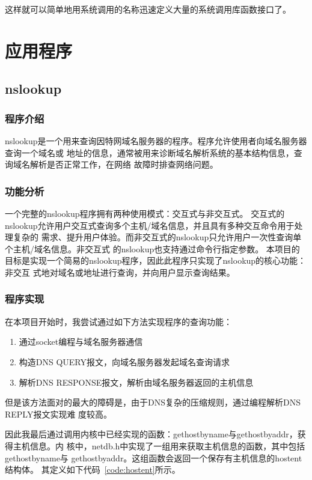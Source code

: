 \documentclass[a4paper,twoside]{ctexrep}
\begin{document}
\begin{spacing}{1.2}
这样就可以简单地用系统调用的名称迅速定义大量的系统调用库函数接口了。


\section{应用程序}
\label{sec:netapp}

\subsection{nslookup}
\label{sec:nslookup}

\subsubsection{程序介绍}

nslookup是一个用来查询因特网域名服务器的程序。程序允许使用者向域名服务器查询一个域名或
地址的信息，通常被用来诊断域名解析系统的基本结构信息，查询域名解析是否正常工作，在网络
故障时排查网络问题。

\subsubsection{功能分析}

一个完整的nslookup程序拥有两种使用模式：交互式与非交互式。
交互式的nslookup允许用户交互式查询多个主机/域名信息，并且具有多种交互命令用于处理复杂的
需求、提升用户体验。而非交互式的nslookup只允许用户一次性查询单个主机/域名信息。非交互式
的nslookup也支持通过命令行指定参数。
本项目的目标是实现一个简易的nslookup程序，因此此程序只实现了nslookup的核心功能：非交互
式地对域名或地址进行查询，并向用户显示查询结果。

\subsubsection{程序实现}

在本项目开始时，我尝试通过如下方法实现程序的查询功能：
\begin{enumerate}
	\item 通过socket编程与域名服务器通信
	\item 构造DNS QUERY报文，向域名服务器发起域名查询请求
	\item 解析DNS RESPONSE报文，解析由域名服务器返回的主机信息
\end{enumerate}

但是该方法⾯对的最大的障碍是，由于DNS复杂的压缩规则，通过编程解析DNS REPLY报文实现难
度较高。

因此我最后通过调用内核中已经实现的函数：gethostbyname与gethostbyaddr，获得主机信息。内
核中，netdb.h中实现了一组用来获取主机信息的函数，其中包括gethostbyname与
gethostbyaddr。这组函数会返回一个保存有主机信息的hostent结构体。
其定义如下代码~\ref{code:hostent}所示。


\end{spacing}
\end{document}
